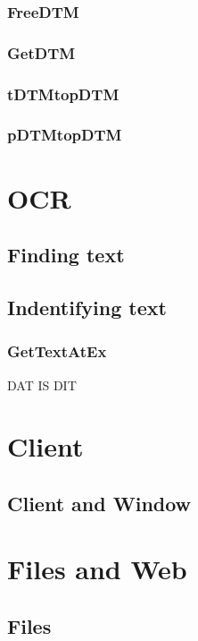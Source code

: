 \documentclass[a4paper]{report}
\begin{document}
\subsection{FreeDTM}

\subsection{GetDTM}

\subsection{tDTMtopDTM}

\subsection{pDTMtopDTM}


\chapter{OCR}

\section{Finding text}

\section{Indentifying text}

\subsection{GetTextAtEx}
DAT IS DIT

\chapter{Client}
\section{Client and Window}

\chapter{Files and Web}

\section{Files}
\end{document}

